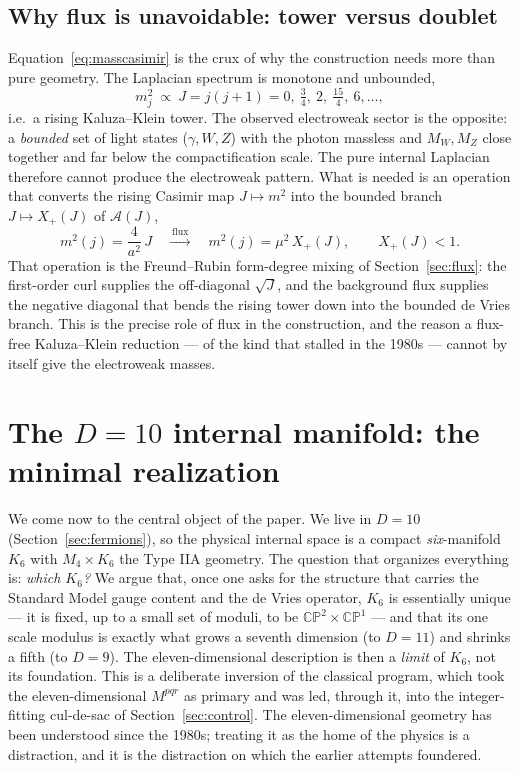 \documentclass[11pt]{article}
\theoremstyle{plain}
\theoremstyle{definition}
\newcommand{\cA}{\mathcal{A}}
\newcommand{\Xp}{X_{+}}
\begin{document}
\subsection{Why flux is unavoidable: tower versus doublet}
\label{sec:towervsdoublet}

Equation~\eqref{eq:masscasimir} is the crux of why the construction needs
more than pure geometry. The Laplacian spectrum is monotone and unbounded,
\begin{equation}
m^2_j\ \propto\ J=j(j+1)=0,\ \tfrac34,\ 2,\ \tfrac{15}4,\ 6,\dots,
\end{equation}
i.e.\ a rising Kaluza--Klein tower. The observed electroweak sector is the
opposite: a \emph{bounded} set of light states ($\gamma,W,Z$) with the photon
massless and $M_W,M_Z$ close together and far below the compactification
scale. The pure internal Laplacian therefore cannot produce the electroweak
pattern. What is needed is an operation that converts the rising Casimir map
$J\mapsto m^2$ into the bounded branch $J\mapsto\Xp(J)$ of $\cA(J)$,
\begin{equation}
m^2(j)=\frac{4}{a^2}\,J
\quad\xrightarrow{\ \text{flux}\ }\quad
m^2(j)=\mu^2\,\Xp(J),\qquad \Xp(J)<1 .
\end{equation}
That operation is the Freund--Rubin form-degree mixing of
Section~\ref{sec:flux}: the first-order curl supplies the off-diagonal
$\sqrt J$, and the background flux supplies the negative diagonal that bends
the rising tower down into the bounded de Vries branch. This is the precise
role of flux in the construction, and the reason a flux-free Kaluza--Klein
reduction --- of the kind that stalled in the 1980s --- cannot by itself give
the electroweak masses.

\section{The $D=10$ internal manifold: the minimal realization}
\label{sec:k6}

We come now to the central object of the paper. We live in $D=10$
(Section~\ref{sec:fermions}), so the physical internal space is a compact
\emph{six}-manifold $K_6$ with $M_4\times K_6$ the Type IIA geometry. The
question that organizes everything is: \emph{which $K_6$?} We argue that, once
one asks for the structure that carries the Standard Model gauge content and
the de Vries operator, $K_6$ is essentially unique --- it is fixed, up to a
small set of moduli, to be $\mathbb{CP}^2\times\mathbb{CP}^1$ --- and that its
one scale modulus is exactly what grows a seventh dimension (to $D=11$) and
shrinks a fifth (to $D=9$). The eleven-dimensional description is then a
\emph{limit} of $K_6$, not its foundation. This is a deliberate inversion of
the classical program, which took the eleven-dimensional $M^{pqr}$ as
primary and was led, through it, into the integer-fitting cul-de-sac of
Section~\ref{sec:control}. The eleven-dimensional geometry has been
understood since the 1980s; treating it as the home of the physics is a
distraction, and it is the distraction on which the earlier attempts
foundered.
\end{document}
